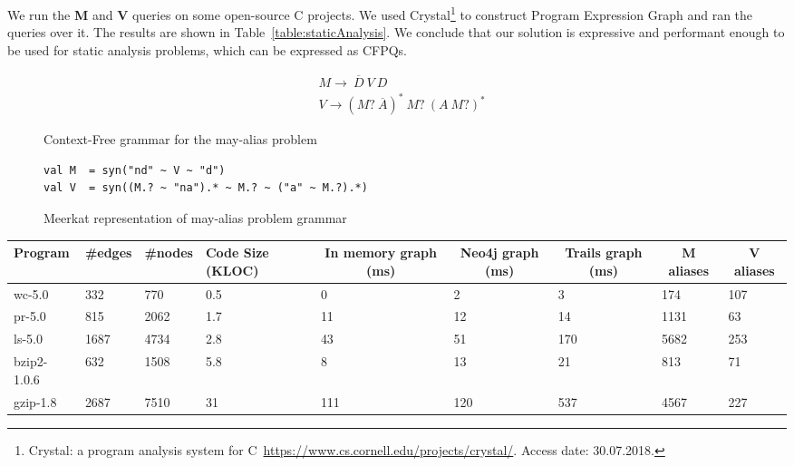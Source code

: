 We run the \textbf{M} and \textbf{V} queries on some open-source C projects.
We used Crystal\footnote{Crystal: a program analysis system for C~\url{https://www.cs.cornell.edu/projects/crystal/}. Access date: 30.07.2018.} to construct Program Expression Graph and ran the queries over it.
The results are shown in Table~\ref{table:staticAnalysis}.
We conclude that our solution is expressive and performant enough to be used for static analysis problems, which can be expressed as CFPQs.

\begin{figure}[t]
\begin{align*}
& M \rightarrow\ \overline{D}\ V\ D\\
& V \rightarrow (M ?\ \overline{A})^{*} \ M?\ (A\ M?)^{*}
\end{align*}
\caption{Context-Free grammar for the may-alias problem}
\label{lst:aliasGrammar}
\end{figure}

\begin{figure}[h]
\begin{lstlisting}
val M  = syn("nd" ~ V ~ "d")
val V  = syn((M.? ~ "na").* ~ M.? ~ ("a" ~ M.?).*)
\end{lstlisting}
\caption{Meerkat representation of may-alias problem grammar}
\label{fig:aliasMeerkat}
\end{figure}


\begin{table*}[t]
\centering
\begin{tabular}{|l|lll|lll|ll|}
\hline
{Program} &
{\#edges} &
{\#nodes} &
{Code Size (KLOC)} &

\multicolumn{1}{c|}{In memory  graph (ms)} &
\multicolumn{1}{c|}{Neo4j graph (ms)} &
\multicolumn{1}{c|}{Trails graph (ms)} &
\multicolumn{1}{c|}{M aliases} &
\multicolumn{1}{c|}{V aliases}  \\
\hline
\hline
wc-5.0      & 332  & 770  & 0.5 & 0   & 2   & 3   & 174  & 107 \\
pr-5.0      & 815  & 2062 & 1.7 & 11  & 12  & 14  & 1131 & 63  \\
ls-5.0      & 1687 & 4734 & 2.8 & 43  & 51  & 170 & 5682 & 253 \\
bzip2-1.0.6 & 632  & 1508 & 5.8 & 8   & 13  & 21  & 813  & 71  \\
gzip-1.8    & 2687 & 7510 & 31  & 111 & 120 & 537 & 4567 & 227 \\
\hline
\end{tabular}
\caption{Running may-alias queries on Meerkat on some C open-source projects}
\label{table:staticAnalysis}
\end{table*}

